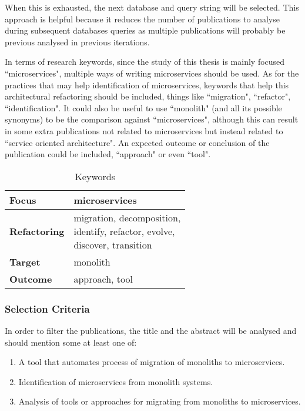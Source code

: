 \documentclass[conference]{IEEEtran}
\newcommand{\wrap}[1]{\parbox{.33\linewidth}{\vspace{1.5mm}#1\vspace{1mm}}}
\begin{document}
When this is exhausted, the next database and query string will be selected.
This approach is helpful because it reduces the number of publications to
analyse during subsequent databases queries as multiple publications will
probably be previous analysed in previous iterations.

In terms of research keywords, since the study of this thesis is mainly
focused ``microservices", multiple ways of writing microservices should be
used. As for the practices that may help identification of microservices,
keywords that help this architectural refactoring should be included, things
like ``migration", ``refactor", ``identification". It could also be useful to
use ``monolith" (and all its possible synonyms) to be the comparison against
``microservices", although this can result in some extra publications not
related to microservices but instead related to ``service oriented
architecture". An expected outcome or conclusion of the publication could be
included, ``approach" or even ``tool".

\begin{table}[H] \caption{Keywords} \label{tab:keywords}
  \begin{center}
    \begin{tabular}[c]{l|l} {\textbf{Focus}} & microservices \\
      \hline \textbf{Refactoring} & {\wrap{ migration, decomposition,\\
          identify, refactor, evolve,\\
      discover, transition }} \\
      \hline \textbf{Target} & monolith \\
      \hline \textbf{Outcome} & approach, tool \\
    \end{tabular}
  \end{center}
\end{table}


\subsubsection{Selection Criteria} \label{sub:selection-criteria}

In order to filter the publications, the title and the abstract will be
analysed and should mention some at least one of:

\begin{enumerate}[{IC}1.]
  \item A tool that automates process of migration of monoliths to
    microservices.
  \item Identification of microservices from monolith systems.
  \item Analysis of tools or approaches for migrating from monoliths to
    microservices.
\end{enumerate}
\end{document}
